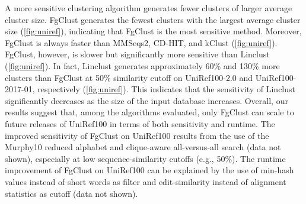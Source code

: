 \documentclass[11pt,letterpaper]{llncs2e/llncs}
\begin{document}
A more sensitive clustering algorithm generates fewer clusters of larger average cluster size.
FgClust generates the fewest clusters with the largest average cluster size (\cref{fig:uniref}), indicating that FgClust is the most sensitive method.
Moreover, FgClust is always faster than MMSeqs2, CD-HIT, and kClust (\cref{fig:uniref}).
FgClust, however, is slower but significantly more sensitive than Linclust  (\cref{fig:uniref}).
In fact, Linclust generates approximately 60\% and 130\% more clusters than FgClust at 50\% similarity cutoff on UniRef100-2.0 and UniRef100-2017-01, respectively (\cref{fig:uniref}).
This indicates that the sensitivity of Linclust significantly decreases as the size of the input database increases. 
Overall, our results suggest that, among the algorithms evaluated, only FgClust can scale to future releases of UniRef100 in terms of both sensitivity and runtime.
The improved sensitivity of FgClust on UniRef100 
results from the use of the Murphy10 reduced alphabet and clique-aware all-versus-all search (data not shown), especially at low sequence-similarity cutoffs (e.g., 50\%).
The runtime improvement of FgClust on UniRef100 can be explained by the use of min-hash values instead of short words as filter and edit-similarity instead of alignment statistics as cutoff (data not shown).
\end{document}
